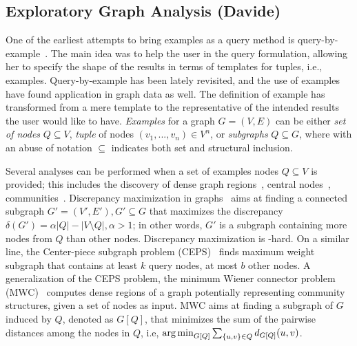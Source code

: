 \subsection{Exploratory Graph Analysis (Davide)} 


One of the earliest attempts to bring examples as a query method is query-by-example~\citep{zloof1975query}.
The main idea was to help the user in the query formulation, allowing her to specify the shape of the results in terms of templates for tuples, i.e., examples.
Query-by-example has been lately revisited, and the use of examples have found application in graph data as well. 
The definition of example has transformed from a mere template to the representative of the intended results the user would like to have.
\emph{Examples} for a graph $G = (V,E)$ can be either \emph{set of nodes} $Q \subseteq V$, \emph{tuple} of nodes $(v_1, ..., v_n) \in V^n$, or \emph{subgraphs} $Q \subseteq G$, where with an abuse of notation $\subseteq$ indicates both set and structural inclusion. 

 Several analyses can be performed when a set of examples nodes $Q\subseteq V$ is provided; this includes the discovery of dense graph regions~\citep{gionis2015bump,ruchansky2015minimum}, central nodes~\citep{tong2006center}, communities~\citep{staudt2014detecting,perozzi2014focused}.%
Discrepancy maximization in graphs~\citep{gionis2015bump} aims at finding a connected subgraph $G' = (V', E'), G' \subseteq G$ that maximizes the discrepancy $\delta(G'){=}\alpha|Q|{-}|V{\setminus}Q|, \alpha > 1$; in other words, $G'$ is a subgraph containing more nodes from $Q$ than other nodes. 
Discrepancy maximization is \NP-hard. 
On a similar line, the Center-piece subgraph problem (CEPS)~\citep{tong2006center} finds maximum weight subgraph that contains at least $k$ query nodes, at most $b$ other nodes. 
A generalization of the CEPS problem, the minimum Wiener connector problem (MWC)~\citep{ruchansky2015minimum} computes dense regions of a graph potentially representing community structures, given a set of nodes as input. MWC aims at finding a subgraph of $G$ induced by $Q$, denoted as $G[Q]$, that minimizes the sum of the pairwise distances among the nodes in $Q$, i.e, $\operatorname*{\arg\min}_{G[Q]}\sum_{\{u,v\}{}\in{}Q}{}d_{G[Q]}(u,v)$. 


